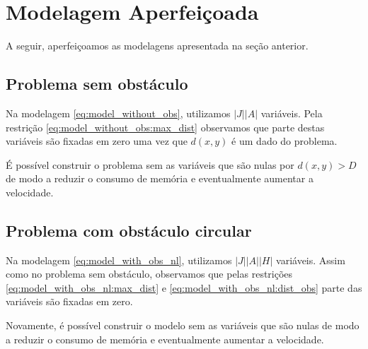%
%
%

\section{Modelagem Aperfei\c{c}oada}
A seguir, aperfei\c{c}oamos as modelagens apresentada na se\c{c}\~{a}o anterior.

\subsection{Problema sem obstáculo}
Na modelagem \eqref{eq:model_without_obs}, utilizamos $|J| |A|$ vari\'{a}veis.
Pela restri\c{c}\~{a}o \eqref{eq:model_without_obs:max_dist} observamos que
parte destas vari\'{a}veis s\~{a}o fixadas em zero uma vez que $d(x, y)$ \'{e}
um dado do problema.

\'{E} poss\'{i}vel construir o problema sem as vari\'{a}veis que s\~{a}o nulas
por $d(x, y) > D$ de modo a reduzir o consumo de mem\'{o}ria e eventualmente
aumentar a velocidade.

\subsection{Problema com obstáculo circular}
Na modelagem \eqref{eq:model_with_obs_nl}, utilizamos $|J| |A| |H|$
vari\'{a}veis. Assim como no problema sem obst\'{a}culo, observamos que pelas
restri\c{c}\~{o}es \eqref{eq:model_with_obs_nl:max_dist} e
\eqref{eq:model_with_obs_nl:dist_obs} parte das vari\'{a}veis s\~{a}o fixadas em
zero.

Novamente, \'{e} poss\'{i}vel construir o modelo sem as vari\'{a}veis que s\~{a}o nulas de
modo a reduzir o consumo de mem\'{o}ria e eventualmente aumentar a velocidade.

